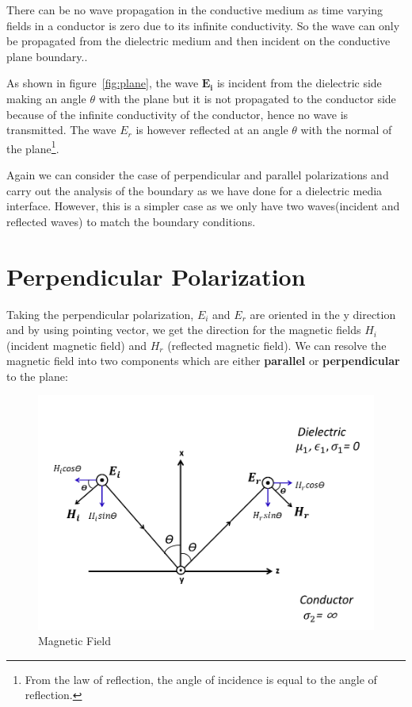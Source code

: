 There can be no wave propagation in the conductive medium as time varying fields in a conductor is zero due to its infinite conductivity. So the wave can only be propagated from the dielectric medium and then incident on the conductive plane boundary..

As shown in figure~\ref{fig:plane}, the wave $\boldsymbol{E_i}$  is incident from the dielectric side making an angle $ \theta $ with the plane but it is not propagated to the conductor side because of the infinite conductivity of the conductor, hence no wave is transmitted. The wave $E_r$ is however reflected at an angle $ \theta $ with the normal of the plane\footnote{From the law of reflection, the angle of incidence is equal to the angle of reflection.}.

Again we can consider the case of perpendicular and parallel polarizations and carry out the analysis of the boundary as we have done for a dielectric media interface. However, this is a simpler case as we only have two waves(incident and reflected waves) to match the boundary conditions.

\section{Perpendicular Polarization}
Taking the perpendicular polarization, $E_i$ and $E_r$ are oriented in the y direction and by using pointing vector, we get the direction for the magnetic fields $H_i$ (incident magnetic field) and $H_r$ (reflected magnetic field). We can resolve the magnetic field into two components which are either \textbf{parallel} or \textbf{perpendicular} to the plane:

\begin{figure}[h]
	\centering
	\includegraphics[width=1.02\linewidth]{./graphics/perpendicular_polarization_at_dielectric_conductor_interface}
	\caption{Magnetic Field}
	\label{fig:fields}
\end{figure}

